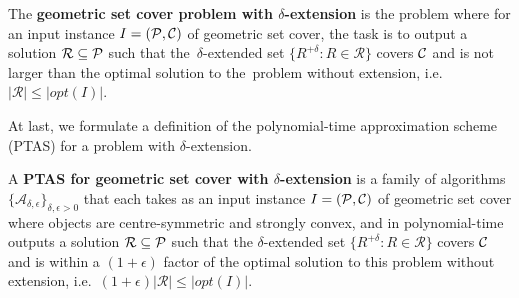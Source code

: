\begin{defi}
The \textbf{geometric set cover problem
with $\delta$-extension} is the problem where for an input instance
$I=(\mathcal{P}, \mathcal{C})$ of geometric set cover,
the task is to output a solution $\mathcal{R} \subseteq \mathcal{P}$
such that the~$\delta$-extended set
$\{ R^{+\delta} :  R \in \mathcal{R} \}$ covers $\mathcal{C}$
and is not larger than the optimal solution to the~problem without
extension, i.e.~$|\mathcal{R}| \le |opt(I)|$.
\end{defi}

At last, we formulate a definition of the
polynomial-time approximation scheme (PTAS)
for a problem with $\delta$-extension.

\begin{defi}
A \textbf{PTAS for geometric set cover 
with $\delta$-extension} is a family of algorithms
$\{\mathcal{A}_{\delta, \epsilon}\}_{\delta, \epsilon > 0}$ that
each takes as an input instance $I=(\mathcal{P}, \mathcal{C})$
of geometric set cover where objects are centre-symmetric and strongly convex,
and in polynomial-time outputs a solution $\mathcal{R} \subseteq \mathcal{P}$
such that the $\delta$-extended set
$\{ R^{+\delta} :  R \in \mathcal{R} \}$ covers $\mathcal{C}$
and is within a $(1+\epsilon)$ factor of the optimal
solution to this problem without
extension, i.e.~$(1+\epsilon)|\mathcal{R}| \le |opt(I)|$.

\end{defi}
